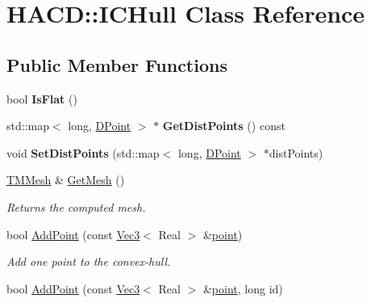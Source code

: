 \hypertarget{class_h_a_c_d_1_1_i_c_hull}{\section{H\+A\+C\+D\+:\+:I\+C\+Hull Class Reference}
\label{class_h_a_c_d_1_1_i_c_hull}
}
\subsection*{Public Member Functions}
\begin{DoxyCompactItemize}
\item 
\hypertarget{class_h_a_c_d_1_1_i_c_hull_a966e0b70a24446d31c1ecd5e5a334678}{bool {\bfseries Is\+Flat} ()}\label{class_h_a_c_d_1_1_i_c_hull_a966e0b70a24446d31c1ecd5e5a334678}

\item 
\hypertarget{class_h_a_c_d_1_1_i_c_hull_a947457ce4aa62734f47b825eb90dac17}{std\+::map$<$ long, \hyperlink{class_h_a_c_d_1_1_d_point}{D\+Point} $>$ $\ast$ {\bfseries Get\+Dist\+Points} () const }\label{class_h_a_c_d_1_1_i_c_hull_a947457ce4aa62734f47b825eb90dac17}

\item 
\hypertarget{class_h_a_c_d_1_1_i_c_hull_a779da7288d52a3d785f4ef3f19c5ea0e}{void {\bfseries Set\+Dist\+Points} (std\+::map$<$ long, \hyperlink{class_h_a_c_d_1_1_d_point}{D\+Point} $>$ $\ast$dist\+Points)}\label{class_h_a_c_d_1_1_i_c_hull_a779da7288d52a3d785f4ef3f19c5ea0e}

\item 
\hypertarget{class_h_a_c_d_1_1_i_c_hull_a8315592856dfefeb5f16cdaff8e0462e}{\hyperlink{class_h_a_c_d_1_1_t_m_mesh}{T\+M\+Mesh} \& \hyperlink{class_h_a_c_d_1_1_i_c_hull_a8315592856dfefeb5f16cdaff8e0462e}{Get\+Mesh} ()}\label{class_h_a_c_d_1_1_i_c_hull_a8315592856dfefeb5f16cdaff8e0462e}

\begin{DoxyCompactList}\small\item\em Returns the computed mesh. \end{DoxyCompactList}\item 
\hypertarget{class_h_a_c_d_1_1_i_c_hull_ad08b1c993cffeee922bfc861b75227cc}{bool \hyperlink{class_h_a_c_d_1_1_i_c_hull_ad08b1c993cffeee922bfc861b75227cc}{Add\+Point} (const \hyperlink{class_h_a_c_d_1_1_vec3}{Vec3}$<$ Real $>$ \&\hyperlink{structpoint}{point})}\label{class_h_a_c_d_1_1_i_c_hull_ad08b1c993cffeee922bfc861b75227cc}

\begin{DoxyCompactList}\small\item\em Add one point to the convex-\/hull. \end{DoxyCompactList}\item 
\hypertarget{class_h_a_c_d_1_1_i_c_hull_aae07f89e3cdd2126f60295b941db77a7}{bool \hyperlink{class_h_a_c_d_1_1_i_c_hull_aae07f89e3cdd2126f60295b941db77a7}{Add\+Point} (const \hyperlink{class_h_a_c_d_1_1_vec3}{Vec3}$<$ Real $>$ \&\hyperlink{structpoint}{point}, long id)}\label{class_h_a_c_d_1_1_i_c_hull_aae07f89e3cdd2126f60295b941db77a7}


\end{DoxyCompactItemize}
